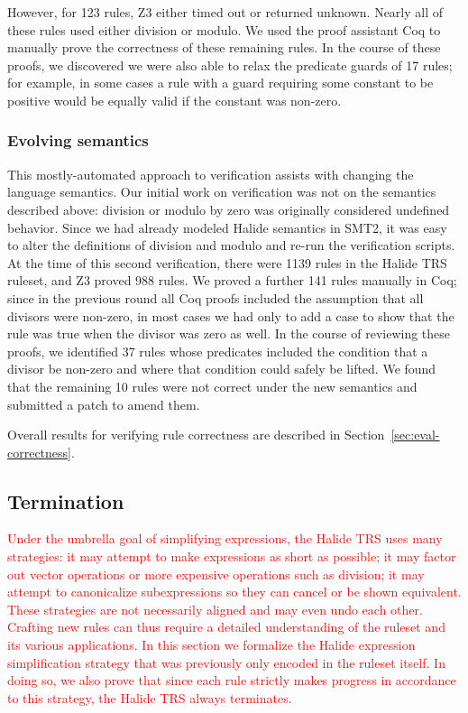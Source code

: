 \documentclass[acmsmall,review]{acmart}\settopmatter{printfolios=true,printccs=false,printacmref=false}
\newcommand{\modified}[1]{\textcolor{red}{{#1}}}
\newcommand{\NumPredicatesRelaxed}{{\color{black} 17}\xspace}
\newcommand{\NumZdivRules}{{\color{black} 1139}\xspace}
\newcommand{\NumZdivZThreeProvedRules}{{\color{black} 988}\xspace}
\newcommand{\NumZdivCoqProvedRules}{{\color{black} 141}\xspace}
\newcommand{\NumZdivFalseRules}{{\color{black} 10}\xspace}
\newcommand{\NumZdivRelaxedPredicates}{{\color{black} 37}\xspace}
\begin{document}
However, for 123
rules, Z3 either timed out or returned unknown. Nearly all of these rules used
either division or modulo. We used the proof assistant Coq to manually prove the
correctness of these remaining rules. In the course of these proofs, we
discovered we were also able to relax the predicate guards of \NumPredicatesRelaxed
rules; for example, in some cases a rule
with a guard requiring some constant to be positive would be equally valid
if the constant was non-zero.


\subsubsection{Evolving semantics}
\label{sub:evolvingsemantics}

This mostly-automated approach to verification assists with changing
the language semantics. Our initial work on verification was not on
the semantics described above: division or modulo by zero was originally
considered undefined behavior. Since we had already
modeled Halide semantics in SMT2, it was easy to alter the
definitions of division and modulo and re-run the verification scripts.
At the time of this second verification, there were
\NumZdivRules rules in the Halide TRS ruleset, and Z3 proved \NumZdivZThreeProvedRules
rules. We proved a further \NumZdivCoqProvedRules rules 
manually in Coq; since in the previous round all Coq proofs
included the assumption that all divisors were non-zero, in most cases
we had only to add a case to show that the rule was true when the
divisor was zero as well. In the course of reviewing
these proofs, we identified \NumZdivRelaxedPredicates rules whose
predicates included the condition that a divisor be non-zero and where
that condition could safely be lifted. We found that the remaining
\NumZdivFalseRules rules were not correct under the new semantics and
submitted a patch to amend them.

Overall results for verifying rule correctness are described in Section~\ref{sec:eval-correctness}.

\subsection{Termination}
\label{sec:termination}

\modified{Under the umbrella goal of simplifying expressions, the Halide TRS uses
many strategies: it may attempt to make expressions as short as possible; it may factor out
vector operations or more expensive operations such as division; it may attempt to
canonicalize subexpressions so they can cancel or be shown equivalent. These
strategies are not necessarily aligned and may even undo each other. Crafting new rules 
can thus require a detailed understanding of the ruleset and its various applications. 
In this section we formalize the Halide expression simplification strategy that was
previously only encoded in the ruleset itself. In doing so, we also prove that since 
each rule strictly makes progress in accordance to this strategy, the Halide TRS always terminates.}
\end{document}
